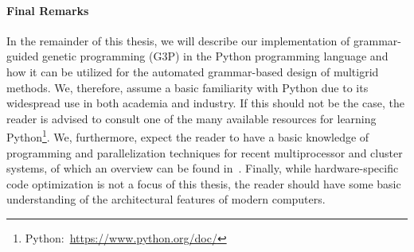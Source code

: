 \paragraph{Final Remarks}
In the remainder of this thesis, we will describe our implementation of grammar-guided genetic programming (G3P) in the Python programming language and how it can be utilized for the automated grammar-based design of multigrid methods.
We, therefore, assume a basic familiarity with Python due to its widespread use in both academia and industry.
If this should not be the case, the reader is advised to consult one of the many available resources for learning Python\footnote{Python:~\url{https://www.python.org/doc/}}.
We, furthermore, expect the reader to have a basic knowledge of programming and parallelization techniques for recent multiprocessor and cluster systems, of which an overview can be found in~\cite{sterling2017high,hager2010introduction}.
Finally, while hardware-specific code optimization is not a focus of this thesis, the reader should have some basic understanding of the architectural features of modern computers.
%	

